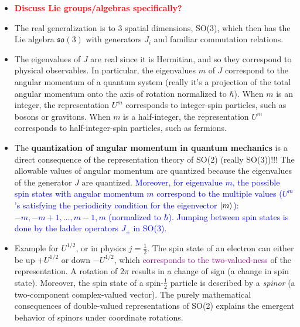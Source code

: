     \begin{itemize}
        \item \textcolor{red}{\textbf{Discuss Lie groups/algebras specifically?}}
        \item The real generalization is to 3 spatial dimensions, SO(3), which then has the Lie algebra $\mathfrak{so}(3)$ with generators $J_i$ and familiar commutation relations.
        \item The eigenvalues of $J$ are real since it is Hermitian, and so they correspond to physical observables. In particular, the eigenvalues $m$ of $J$ correspond to the angular momentum of a quantum system (really it's a projection of the total angular momentum onto the axis of rotation normalized to $\hbar$). When $m$ is an integer, the representation $U^m$ corresponds to integer-spin particles, such as bosons or gravitons. When $m$ is a half-integer, the representation $U^m$ corresponds to half-integer-spin particles, such as fermions.
        \item The \textbf{quantization of angular momentum in quantum mechanics} is a direct consequence of the representation theory of SO(2) (really SO(3))!!! The allowable values of angular momentum are quantized because the eigenvalues of the generator $J$ are quantized. \textcolor{blue}{Moreover, for eigenvalue $m$, the possible spin states with angular momentum $m$ correspond to the multiple values ($U^m$'s satisfying the periodicity condition for the eigenvector $\ket{m}$): $-m, -m+1, \dots, m-1, m$ (normalized to $\hbar$). Jumping between spin states is done by the ladder operators $J_\pm$ in SO(3).}
        \item Example for $U^{1/2}$, or in physics $j=\frac{1}{2}$. The spin state of an electron can either be up $+U^{1/2}$ or down $-U^{1/2}$, which \textcolor{purple}{corresponds to the two-valued-ness} of the representation. A rotation of $2\pi$ results in a change of sign (a change in spin state). Moreover, the spin state of a spin-$\frac{1}{2}$ particle is described by a \textit{spinor} (a two-component complex-valued vector). The purely mathematical consequences of double-valued representations of SO(2) explains the emergent behavior of spinors under coordinate rotations.
    \end{itemize}

